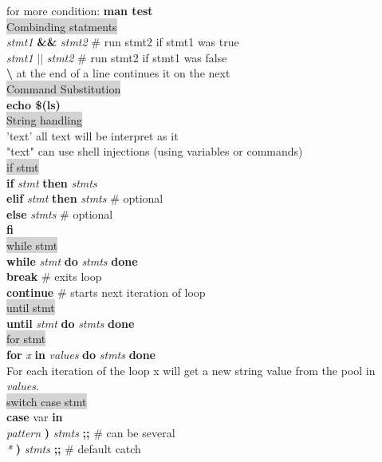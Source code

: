 \documentclass[1pt]{proc}
\begin{document}
\begin{landscape}
\begin{multicols}{3}
for more condition: \textbf{man test}\\
\colorbox{lightgray}{ Combinding statments}\\
\textit{stmt1} \textbf{\&\&} \textit{stmt2} \# run stmt2 if stmt1 was true \\
\textit{stmt1} \textbf{$||$} \textit{stmt2} \# run stmt2 if stmt1 was false \\
\textbf{\textbackslash} at the end of a line continues it on the next\\
\colorbox{lightgray}{Command Substitution}\\
\textbf{echo \$(ls)}\\
\colorbox{lightgray}{String handling}\\
'text' all text will be interpret as it \\
"text" can use shell injections (using variables or commands)\\
\colorbox{lightgray}{if stmt}\\
\textbf{if} \textit{stmt}
\textbf{then}
\textit{stmts}\\
\textbf{elif} \textit{stmt} 
\textbf{then} \textit{stmts} \# optional\\ 
\textbf{else} \textit{stmts} \# optional\\
\textbf{fi}\\
\colorbox{lightgray}{while stmt}\\
\textbf{while} \textit{stmt}
\textbf{do}
\textit{stmts}
\textbf{done} \\
\textbf{break} \# exits loop \\
\textbf{continue} \# starts next iteration of loop\\
\colorbox{lightgray}{until stmt}\\
\textbf{until} \textit{stmt}
\textbf{do}
\textit{stmts}
\textbf{done} \\
\colorbox{lightgray}{for stmt}\\
\textbf{for} \textit{x} \textbf{in} \textit{values}
\textbf{do}
\textit{stmts}
\textbf{done}  \\
For each iteration of the loop x will get a new string value from the  pool in \textit{values}.\\
\colorbox{lightgray}{switch case stmt}\\
\textbf{case} var \textbf{in} \\
\textit{pattern}
\textbf{)}
\textit{stmts}
\textbf{;;}
\# can be several \\
\textit{*}
\textbf{)}
\textit{stmts}
\textbf{;;} \# default catch \\

\end{multicols}
\end{landscape}
\end{document}
